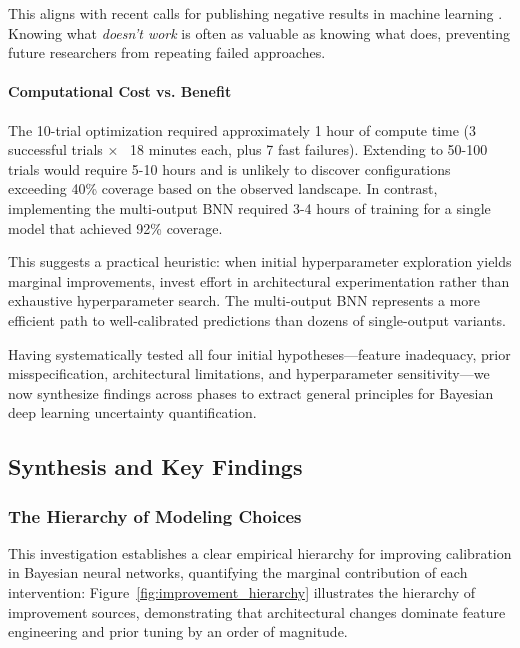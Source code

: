 This aligns with recent calls for publishing negative results in machine learning \citep{sculley2018winner}. Knowing what \textit{doesn't work} is often as valuable as knowing what does, preventing future researchers from repeating failed approaches.

\paragraph{Computational Cost vs. Benefit}

The 10-trial optimization required approximately 1 hour of compute time (3 successful trials × ~18 minutes each, plus 7 fast failures). Extending to 50-100 trials would require 5-10 hours and is unlikely to discover configurations exceeding 40\% coverage based on the observed landscape. In contrast, implementing the multi-output BNN required 3-4 hours of training for a single model that achieved 92\% coverage.

This suggests a practical heuristic: when initial hyperparameter exploration yields marginal improvements, invest effort in architectural experimentation rather than exhaustive hyperparameter search. The multi-output BNN represents a more efficient path to well-calibrated predictions than dozens of single-output variants.

Having systematically tested all four initial hypotheses—feature inadequacy, prior misspecification, architectural limitations, and hyperparameter sensitivity—we now synthesize findings across phases to extract general principles for Bayesian deep learning uncertainty quantification.

\subsection{Synthesis and Key Findings}
\label{subsec:synthesis}

\subsubsection{The Hierarchy of Modeling Choices}

This investigation establishes a clear empirical hierarchy for improving calibration in Bayesian neural networks, quantifying the marginal contribution of each intervention:
Figure~\ref{fig:improvement_hierarchy} illustrates the hierarchy of improvement sources, demonstrating that architectural changes dominate feature engineering and prior tuning by an order of magnitude.

